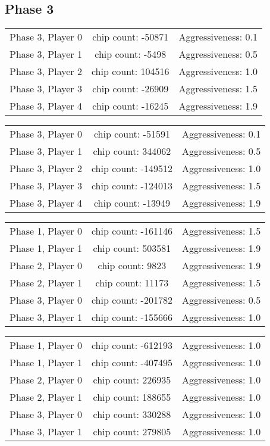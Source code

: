 \documentclass[titlepage, a4paper]{article}
\begin{document}
\subsection{Phase 3}\label{phase 3 results}

\begin{tabular}{| l | c | r |}
	\hline
	Phase 3, Player 0 & chip count: -50871 & Aggressiveness: 0.1\\
	Phase 3, Player 1 & chip count: -5498 & Aggressiveness: 0.5\\
	Phase 3, Player 2 & chip count: 104516 & Aggressiveness: 1.0\\
	Phase 3, Player 3 & chip count: -26909 & Aggressiveness: 1.5\\
	Phase 3, Player 4 & chip count: -16245 & Aggressiveness: 1.9\\
	\hline
\end{tabular}

\begin{tabular}{| l | c | r |}
	\hline
	Phase 3, Player 0 & chip count: -51591 & Aggressiveness: 0.1\\
	Phase 3, Player 1 & chip count: 344062 & Aggressiveness: 0.5\\
	Phase 3, Player 2 & chip count: -149512 & Aggressiveness: 1.0\\
	Phase 3, Player 3 & chip count: -124013 & Aggressiveness: 1.5\\
	Phase 3, Player 4 & chip count: -13949 & Aggressiveness: 1.9\\
	\hline
\end{tabular}

\begin{tabular}{| l | c | r |}
	\hline
	Phase 1, Player 0 & chip count: -161146 & Aggressiveness: 1.5\\
	Phase 1, Player 1 & chip count: 503581 & Aggressiveness: 1.9\\
	Phase 2, Player 0 & chip count: 9823 & Aggressiveness: 1.9\\
	Phase 2, Player 1 & chip count: 11173 & Aggressiveness: 1.5\\
	Phase 3, Player 0 & chip count: -201782 & Aggressiveness: 0.5\\
	Phase 3, Player 1 & chip count: -155666 & Aggressiveness: 1.0\\
	\hline
\end{tabular}

\begin{tabular}{| l | c | r |}
	\hline
	Phase 1, Player 0 & chip count: -612193 & Aggressiveness: 1.0\\
	Phase 1, Player 1 & chip count: -407495 & Aggressiveness: 1.0\\
	Phase 2, Player 0 & chip count: 226935 & Aggressiveness: 1.0\\
	Phase 2, Player 1 & chip count: 188655 & Aggressiveness: 1.0\\
	Phase 3, Player 0 & chip count: 330288 & Aggressiveness: 1.0\\
	Phase 3, Player 1 & chip count: 279805 & Aggressiveness: 1.0\\
	\hline
\end{tabular}
\end{document}

